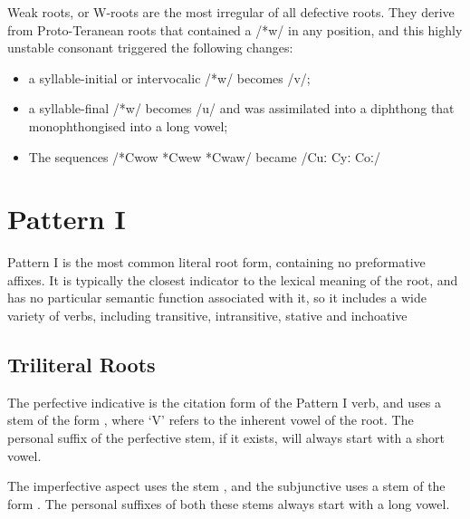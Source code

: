 \documentclass[grammar]{subfiles}
\begin{document}
Weak roots, or W-roots are the most irregular of all defective roots.  They
derive from Proto-Teranean roots that contained a /*w/ in any position, and
this highly unstable consonant triggered the following changes:

\begin{itemize}
  \item a syllable-initial or intervocalic /*w/ becomes /v/;
  \item a syllable-final /*w/ becomes /u/ and was assimilated into a diphthong
    that monophthongised into a long vowel;
  \item The sequences /*Cwow *Cwew *Cwaw/ became /Cuː Cyː Coː/
\end{itemize}


\clearpage
\section{Pattern I}
\label{sec:vm:verb_pattern_i}

Pattern I is the most common literal root form, containing no preformative
affixes.  It is typically the closest indicator to the lexical meaning of the
root, and has no particular semantic function associated with it, so it
includes a wide variety of verbs, including transitive, intransitive, stative
and inchoative


\subsection{Triliteral Roots}
\label{ssec:vm:i_triliteral}
%
%

The perfective indicative is the citation form of the Pattern I verb, and uses
a stem of the form , where ‘V’ refers to the inherent vowel
of the root.  The personal suffix of the perfective stem, if it exists, will always
start with a short vowel.


The imperfective aspect uses the stem , and the subjunctive
uses a stem of the form .  The personal suffixes of both these stems
always start with a long vowel.
\end{document}
